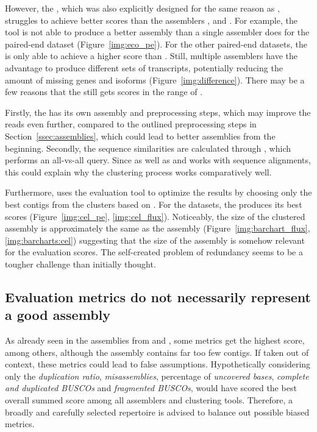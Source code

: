 \documentclass[12pt,a4paper,english]{article}
\begin{document}
		However, the \orp, which was also explicitly designed for the same reason as \karma,  struggles to achieve better scores than the assemblers \soap, \spades and \trinity. 
		For example, the tool is not able to produce a better assembly than a single assembler does for the paired-end \ecoli dataset (Figure~\ref{img:eco_pe}). For the other paired-end \celegans datasets, the \orp is only able to achieve a higher score than \soap. 
		Still, multiple assemblers have the advantage to produce different sets of transcripts, potentially reducing the amount of missing genes and isoforms (Figure~\ref{img:difference}).
		There may be a few reasons that the \orp still gets scores in the range of \cdhit. 

		
		Firstly, the \orp has its own assembly and preprocessing steps, which may improve the reads even further, compared to the outlined preprocessing steps in Section~\ref{ssec:assemblies}, which could lead to better assemblies from the beginning.
		Secondly, the sequence similarities are calculated through \orthofinder \citep{OrthoFinder:15}, which performs an all-vs-all \blast \citep{blast:90} query.
		Since \blast as well as \cdhit and \linclust works with sequence alignments, this could explain why the clustering process works comparatively well.
		
		Furthermore, \citeauthor{OysterRiverProtocol:18} \citep{OysterRiverProtocol:18} uses the evaluation tool \transrate to optimize the results by choosing only the best contigs from the clusters based on \transrate.
		For the \celegans datasets, the \orp produces its best scores (Figure~\ref{img:cel_pe}, \ref{img:cel_flux}). Noticeably, the size of the clustered assembly is approximately the same as the \cdhit assembly (Figure~\ref{img:barchart_flux}, \ref{img:barcharts:cel}) suggesting that the size of the assembly is somehow relevant for the evaluation scores.
		The self-created problem of redundancy seems to be a tougher challenge than initially thought.
	
	\subsection{Evaluation metrics do not necessarily represent a good assembly}
	    As already seen in the assemblies from \karma and \grouper, some metrics get the highest score, among others, although the assembly contains far too few contigs.
		If taken out of context, these metrics could lead to false assumptions. Hypothetically considering only the \textit{duplication ratio}, \textit{misassemblies}, percentage of \textit{uncovered bases}, \textit{complete and duplicated BUSCOs} and \textit{fragmented BUSCOs}, \grouper would have scored the best overall summed score among all assemblers and clustering tools.
		Therefore, a broadly and carefully selected repertoire is advised to balance out possible biased metrics.
	
\end{document}
